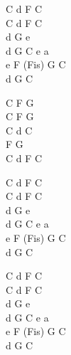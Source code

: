 \documentclass[a5paper, 10pt]{book}
\begin{document}
\begin{minipage}[t]{0.3\textwidth}
  C d F C\\
  C d F C\\
  d G e \\
  d G C e a\\
  e F (Fis) G C\\
  d G C\vspace*{1.5mm}

  C F G \\
  C F G \\
  C d C \\
  F G \\
  C d F C\vspace*{1.5mm}

  C d F C\\
  C d F C\\
  d G e \\
  d G C e a\\
  e F (Fis) G C\\
  d G C\vspace*{1.5mm}

  C d F C\\
  C d F C\\
  d G e \\
  d G C e a\\
  e F (Fis) G C\\
  d G C\vspace*{1.5mm}
\end{minipage}


\newpage
\end{document}
